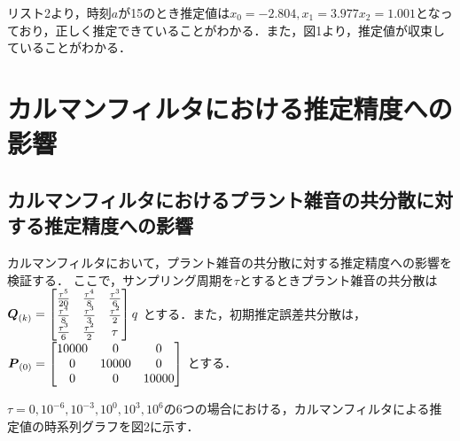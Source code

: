 \documentclass[a4paper]{jarticle}
\begin{document}
リスト2より，時刻$a$が15のとき推定値は\(x_{0}=-2.804, x_1 = 3.977 x_2 = 1.001\)となっており，正しく推定できていることがわかる．また，図1より，推定値が収束していることがわかる．

\newpage
\section{カルマンフィルタにおける推定精度への影響}
\subsection{カルマンフィルタにおけるプラント雑音の共分散に対する推定精度への影響}

カルマンフィルタにおいて，プラント雑音の共分散に対する推定精度への影響を検証する．
ここで，サンプリング周期を$\tau$とするときプラント雑音の共分散は
\(
\mbox{\boldmath $Q$}_{(k)} =
\begin{bmatrix}
\frac{\tau^5}{20} & \frac{\tau^4}{8} & \frac{\tau^3}{6}\\
\frac{\tau^4}{8} & \frac{\tau^3}{3} & \frac{\tau^2}{2}\\
\frac{\tau^3}{6} & \frac{\tau^2}{2} & \tau \\ 
\end{bmatrix} q
\)
とする．また，初期推定誤差共分散は，
\(
\mbox{\boldmath $P$}_{(0)} =
\begin{bmatrix}
{10000} & 0 & 0\\
0 & {10000} & 0\\
0 & 0 & {10000} \\ 
\end{bmatrix} 
\)
とする．

\(\tau=0, 10^{-6}, 10^{-3}, 10^{0}, 10^{3}, 10^{6}\)の6つの場合における，カルマンフィルタによる推定値の時系列グラフを図2に示す．
\end{document}
